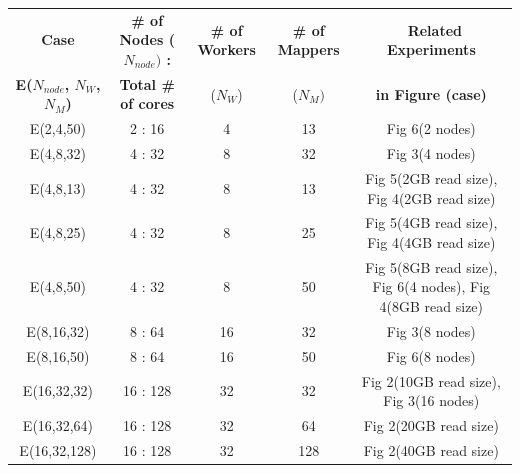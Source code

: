 \documentclass{acm_proc_article-sp}
\begin{document}
\begin{center}
\begin{table}[ht]
\small
\hfill{}
 \begin{tabular}{|c|c|c|c|c|} 
 \hline 

 \textbf{Case} &  \textbf{ \# of  Nodes ($N_{node})$ :}  &  \textbf{\# of Workers} &   \textbf{\# of Mappers} & \  \textbf{Related Experiments} \\
 \textbf{E($N_{node}$, $N_W$,  $N_M$)} &  \textbf{Total \# of cores} &   ($N_W$)  & ($N_M)$  &  \textbf{ in Figure (case)}  \\
 \hline
  \hline
E(2,4,50) &2 : 16 & 4 & 13 & Fig 6(2 nodes) \\
E(4,8,32) & 4 : 32 & 8 & 32 & Fig 3(4 nodes) \\
E(4,8,13) & 4 : 32 & 8 & 13 & Fig 5(2GB read size), Fig 4(2GB read size) \\
E(4,8,25) & 4 : 32 & 8 & 25 & Fig 5(4GB read size), Fig 4(4GB read size) \\ 
E(4,8,50) & 4 : 32 & 8 & 50 & Fig 5(8GB read size), Fig 6(4 nodes), Fig 4(8GB read size)\\ 
E(8,16,32) & 8 : 64 & 16 & 32 & Fig 3(8 nodes)\\ 
E(8,16,50) & 8 : 64& 16 & 50 & Fig 6(8 nodes)\\ 
E(16,32,32) & 16 : 128 & 32 & 32 & Fig 2(10GB read size), Fig 3(16 nodes)\\ 
E(16,32,64) & 16 : 128 & 32 & 64 & Fig 2(20GB read size)\\ 
E(16,32,128) & 16 : 128 & 32 & 128 & Fig 2(40GB read size)\\ 


 \hline
 \end{tabular}
 \hfill{}



\end{table}
\end{center}
\end{document}
